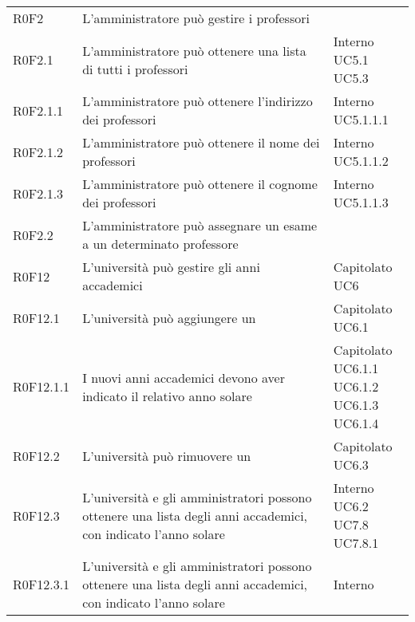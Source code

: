 \documentclass[AnalisiDeiRequisiti.tex]{subfiles}
\begin{document}
\begin{longtable}[H]{p{2cm}p{5.2cm}p{5cm}}
	R0F2 & L'amministratore può gestire i professori & \makecell[tl]{
		Interno
	} \\
	R0F2.1 & L'amministratore può ottenere una lista di tutti i professori & \makecell[tl]{
		Interno \\ 
		UC5.1 \\
		UC5.3 
	} \\
	R0F2.1.1 & L'amministratore può ottenere l'indirizzo dei professori & \makecell[tl]{
		Interno \\ 
		UC5.1.1.1
	} \\
	R0F2.1.2 & L'amministratore può ottenere il nome dei professori & \makecell[tl]{
		Interno \\ 
		UC5.1.1.2
	} \\
	R0F2.1.3 & L'amministratore può ottenere il cognome dei professori & \makecell[tl]{
		Interno \\ 
		UC5.1.1.3
	} \\
	R0F2.2 & L'amministratore può assegnare un esame a un determinato professore & \makecell[tl]{
		Capitolato
	} \\
	R0F12& L'università può gestire gli anni accademici & \makecell[tl]{
		Capitolato \\ 
		UC6
	} \\
	R0F12.1 & L'università può aggiungere un \citGloss{anno accademico} & \makecell[tl]{
		Capitolato \\ 
		UC6.1 \\ 
	} \\
	R0F12.1.1 & I nuovi anni accademici devono aver indicato il relativo anno solare  & \makecell[tl]{
		Capitolato \\ 
		UC6.1.1 \\
		UC6.1.2 \\ 
		UC6.1.3
		UC6.1.4
	} \\
	R0F12.2 & L'università può rimuovere un \citGloss{anno accademico} & \makecell[tl]{
	Capitolato \\ 
	UC6.3
	} \\
	R0F12.3 &  L'università e gli amministratori possono ottenere una lista degli anni accademici, con indicato l'anno solare & \makecell[tl]{
		Interno \\ 
		UC6.2 \\
		UC7.8 \\
		UC7.8.1
	} \\ 
	R0F12.3.1 &  L'università e gli amministratori possono ottenere una lista degli anni accademici, con indicato l'anno solare & \makecell[tl]{
	Interno \\ 
}
\end{longtable}
\end{document}
